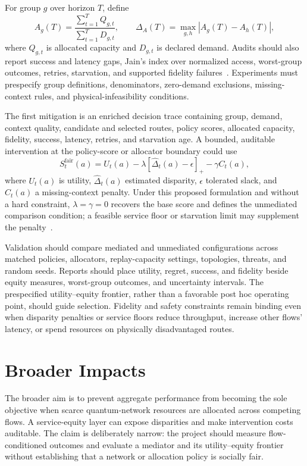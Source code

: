 \documentclass[10pt,conference]{IEEEtran}
\begin{document}
For group $g$ over horizon $T$, define
\begin{equation}
 A_g(T)=\frac{\sum_{t=1}^{T}Q_{g,t}}{\sum_{t=1}^{T}D_{g,t}},
 \qquad
 \Delta_A(T)=\max_{g,h}|A_g(T)-A_h(T)|,
\end{equation}
where $Q_{g,t}$ is allocated capacity and $D_{g,t}$ is declared demand. Audits
should also report success and latency gaps, Jain's index over normalized
access, worst-group outcomes, retries, starvation, and supported fidelity
failures~\cite{jain1984quantitative}. Experiments must prespecify group
definitions, denominators, zero-demand exclusions, missing-context rules, and
physical-infeasibility conditions.

The first mitigation is an enriched decision trace containing group, demand,
context quality, candidate and selected routes, policy scores, allocated
capacity, fidelity, success, latency, retries, and starvation age. A bounded,
auditable intervention at the policy-score or allocator boundary could use
\begin{equation}
 S_t^{\mathrm{fair}}(a)=U_t(a)
 -\lambda[\widehat{\Delta}_t(a)-\epsilon]_+-\gamma C_t(a),
\end{equation}
where $U_t(a)$ is utility, $\widehat{\Delta}_t(a)$ estimated disparity,
$\epsilon$ tolerated slack, and $C_t(a)$ a missing-context penalty. Under this
proposed formulation and without a hard constraint, $\lambda=\gamma=0$ recovers
the base score and defines the unmediated comparison condition; a feasible
service floor or starvation limit may supplement the penalty~\cite{chen2020fair}.

Validation should compare mediated and unmediated configurations across matched
policies, allocators, replay-capacity settings, topologies, threats, and random
seeds. Reports should place utility, regret, success, and fidelity beside equity measures,
worst-group outcomes, and uncertainty intervals. The prespecified
utility--equity frontier, rather than a favorable post hoc operating point,
should guide selection. Fidelity and safety constraints remain binding even
when disparity penalties or service floors reduce throughput, increase other
flows' latency, or spend resources on physically disadvantaged routes.

\section{Broader Impacts}

The broader aim is to prevent aggregate performance from becoming the sole
objective when scarce quantum-network resources are allocated across competing
flows. A service-equity layer can expose disparities and make intervention
costs auditable. The claim is deliberately narrow: the project should measure
flow-conditioned outcomes and evaluate a mediator and its utility--equity
frontier without establishing that a network or allocation policy is socially
fair.
\end{document}

